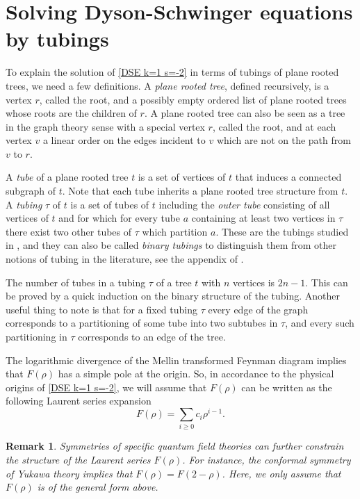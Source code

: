 \documentclass[oneside]{amsart}
\newtheorem{remark}[thm]{Remark}
\theoremstyle{definition}
\begin{document}
\section{Solving Dyson-Schwinger equations by tubings}

To explain the solution of \eqref{DSE k=1 s=-2} in terms of tubings of plane rooted trees, we need a few definitions.  A \emph{plane rooted tree}, defined recursively, is a vertex $r$, called the root, and a possibly empty ordered list of plane rooted trees whose roots are the children of $r$.  A plane rooted tree can also be seen as a tree in the graph theory sense with a special vertex $r$, called the root, and at each vertex $v$ a linear order on the edges incident to $v$ which are not on the path from $v$ to $r$.

A \emph{tube} of a plane rooted tree $t$ is a set of vertices of $t$ that induces a connected subgraph of $t$.  Note that each tube inherits a plane rooted tree structure from $t$.  A \emph{tubing} $\tau$ of $t$ is a set of tubes of $t$ including the \emph{outer tube} consisting of all vertices of $t$ and for which for every tube $a$ containing at least two vertices in $\tau$ there exist two other tubes of $\tau$ which partition $a$.  These are the tubings studied in \cite{BCEFNOHY}, and they can also be called \emph{binary tubings} to distinguish them from other notions of tubing in the literature, see the appendix of \cite{BCEFNOHY}.

The number of tubes in a tubing $\tau$ of a tree $t$ with $n$ vertices is $2n-1$. This can be proved by a quick induction on the binary structure of the tubing.  Another useful thing to note is that for a fixed tubing $\tau$ every edge of the graph corresponds to a partitioning of some tube into two subtubes in $\tau$, and every such partitioning in $\tau$ corresponds to an edge of the tree.

%
%
The logarithmic divergence of the Mellin transformed Feynman diagram implies that $F(\rho)$ has a simple pole at the origin.  So, in accordance to the physical origins of \eqref{DSE k=1 s=-2}, we will assume that $F(\rho)$ can be written as the following Laurent series expansion
\[
F(\rho) = \sum_{i\geq 0} c_i\rho^{i-1}.
\]
\begin{remark}
Symmetries of specific quantum field theories can further constrain 
the structure of the Laurent series $F(\rho)$. 
For instance, the conformal symmetry of Yukawa theory implies that $F(\rho) = F(2-\rho)$.
Here, we only assume that $F(\rho)$ is of the general form above.
\end{remark}
%
%
\end{document}
